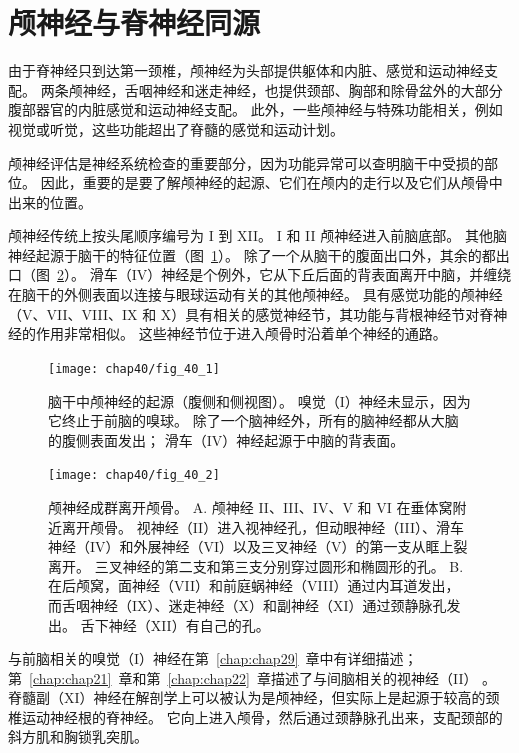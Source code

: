 \section{颅神经与脊神经同源}

由于脊神经只到达第一颈椎，颅神经为头部提供躯体和内脏、感觉和运动神经支配。
两条颅神经，舌咽神经和迷走神经，也提供颈部、胸部和除骨盆外的大部分腹部器官的内脏感觉和运动神经支配。
此外，一些颅神经与特殊功能相关，例如视觉或听觉，这些功能超出了脊髓的感觉和运动计划。


颅神经评估是神经系统检查的重要部分，因为功能异常可以查明脑干中受损的部位。
因此，重要的是要了解颅神经的起源、它们在颅内的走行以及它们从颅骨中出来的位置。


颅神经传统上按头尾顺序编号为 I 到 XII。
I 和 II 颅神经进入前脑底部。
其他脑神经起源于脑干的特征位置（图~\ref{fig:40_1}）。
除了一个从脑干的腹面出口外，其余的都出口（图~\ref{fig:40_2}）。
滑车（IV）神经是个例外，它从下丘后面的背表面离开中脑，并缠绕在脑干的外侧表面以连接与眼球运动有关的其他颅神经。
具有感觉功能的颅神经（V、VII、VIII、IX 和 X）具有相关的感觉神经节，其功能与背根神经节对脊神经的作用非常相似。
这些神经节位于进入颅骨时沿着单个神经的通路。


\begin{figure}[htbp]
	\centering
	\texttt{[image: chap40/fig\_40\_1]}
	\caption{脑干中颅神经的起源（腹侧和侧视图）。
		嗅觉（I）神经未显示，因为它终止于前脑的嗅球。
		除了一个脑神经外，所有的脑神经都从大脑的腹侧表面发出； 
		滑车（IV）神经起源于中脑的背表面。}
	\label{fig:40_1}
\end{figure}


\begin{figure}[htbp]
	\centering
	\texttt{[image: chap40/fig\_40\_2]}
	\caption{颅神经成群离开颅骨。
		A. 颅神经 II、III、IV、V 和 VI 在垂体窝附近离开颅骨。
		视神经（II）进入视神经孔，但动眼神经（III）、滑车神经（IV）和外展神经（VI）以及三叉神经（V）的第一支从眶上裂离开。
		三叉神经的第二支和第三支分别穿过圆形和椭圆形的孔。
		B. 在后颅窝，面神经（VII）和前庭蜗神经（VIII）通过内耳道发出，而舌咽神经（IX）、迷走神经（X）和副神经（XI）通过颈静脉孔发出。
		舌下神经（XII）有自己的孔。}
	\label{fig:40_2}
\end{figure}



与前脑相关的嗅觉（I）神经在第~\ref{chap:chap29}~章中有详细描述；
第~\ref{chap:chap21}~章和第~\ref{chap:chap22}~章描述了与间脑相关的视神经（II） 。
脊髓副（XI）神经在解剖学上可以被认为是颅神经，但实际上是起源于较高的颈椎运动神经根的脊神经。
它向上进入颅骨，然后通过颈静脉孔出来，支配颈部的斜方肌和胸锁乳突肌。



